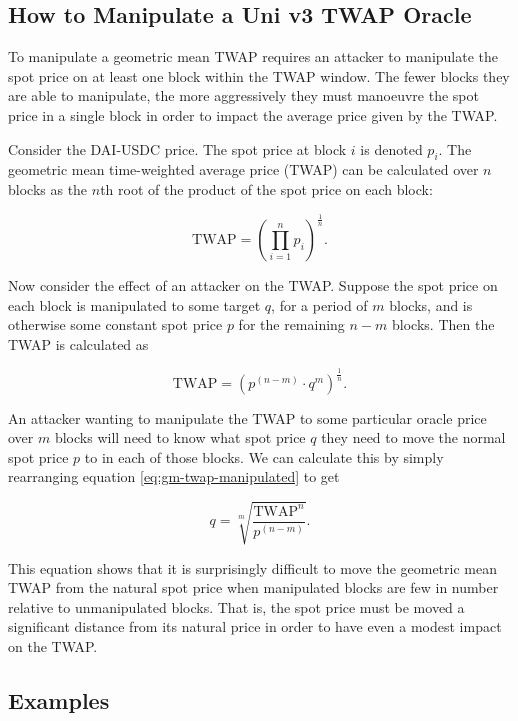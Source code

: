 \documentclass[a4paper, 11pt]{article}
\begin{document}
\subsection{How to Manipulate a Uni v3 TWAP Oracle}

To manipulate a geometric mean TWAP requires an attacker to manipulate the spot price on at least one block within the TWAP window. The fewer blocks they are able to manipulate, the more aggressively they must manoeuvre the spot price in a single block in order to impact the average price given by the TWAP.

Consider the DAI-USDC price. The spot price at block $i$ is denoted $p_i$. The geometric mean time-weighted average price (TWAP) can be calculated over $n$ blocks as the $n$th root of the product of the spot price on each block:

\begin{equation}
\text{TWAP}
=
\left( \prod_{i=1}^n p_i \right)^{\frac{1}{n}}.
\end{equation}

Now consider the effect of an attacker on the TWAP. Suppose the spot price on each block is manipulated to some target $q$, for a period of $m$ blocks, and is otherwise some constant spot price $p$ for the remaining $n - m$ blocks. Then the TWAP is calculated as

\begin{equation}
\label{eq:gm-twap-manipulated}
\text{TWAP}
=
\left( p^{(n-m)} \cdot q^m \right)^{\frac{1}{n}}.
\end{equation}

An attacker wanting to manipulate the TWAP to some particular oracle price over $m$ blocks will need to know what spot price $q$ they need to move the normal spot price $p$ to in each of those blocks. We can calculate this by simply rearranging equation \eqref{eq:gm-twap-manipulated} to get

\begin{equation}
q
=
\sqrt[m]{\frac{\text{TWAP}^n}{p^{(n-m)}}}.
\end{equation}

This equation shows that it is surprisingly difficult to move the geometric mean TWAP from the natural spot price when manipulated blocks are few in number relative to unmanipulated blocks. That is, the spot price must be moved a significant distance from its natural price in order to have even a modest impact on the TWAP. 

\subsection{Examples}
\end{document}
